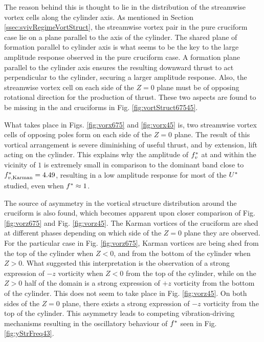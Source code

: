 \documentclass[oneside]{utmthesis}
\begin{document}
The reason behind this is thought to lie in the distribution of the streamwise vortex cells along the cylinder axis. As mentioned in Section \ref{ssec:svivRegimeVortStruct}, the streamwise vortex pair in the pure cruciform case lie on a plane parallel to the axis of the cylinder. The shared plane of formation parallel to cylinder axis is what seems to be the key to the large amplitude response observed in the pure cruciform case. A formation plane parallel to the cylinder axis ensures the resulting downward thrust to act perpendicular to the cylinder, securing a larger amplitude response. Also, the streamwise vortex cell on each side of the $Z = 0$ plane must be of opposing rotational direction for the production of thrust. These two aspects are found to be missing in the \angfo{} and \angth{} cruciforms in Fig. \ref{fig:vortStruct67545}.

What takes place in Figs. \ref{fig:vorx675} and \ref{fig:vorx45} is, two streamwise vortex cells of opposing poles form on each side of the $Z = 0$ plane. The result of this vortical arrangement is severe diminishing of useful thrust, and by extension, lift acting on the cylinder. This explains why the amplitude of $f^{*}_{v}$ at and within the vicinity of $1$ is extremely small in comparison to the dominant band close to $f^{*}_{v,\text{Karman}} = 4.49$, resulting in a low amplitude response for most of the $U^{*}$ studied, even when $f^{*} \approx 1$.

The source of asymmetry in the vortical structure distribution around the cruciform is also found, which becomes apparent upon closer comparison of Fig. \ref{fig:vorz675} and Fig. \ref{fig:vorz45}. The Karman vortices of the \angfo{} cruciform are shed at different phases depending on which side of the $Z = 0$ plane they are observed. For the particular case in Fig. \ref{fig:vorz675}, Karman vortices are being shed from the top of the cylinder when $Z < 0$, and from the bottom of the cylinder when $Z > 0$. What suggested this interpretation is the observation of a strong expression of $-z$ vorticity when $Z < 0$ from the top of the cylinder, while on the $Z > 0$ half of the domain is a strong expression of $+z$ vorticity from the bottom of the cylinder. This does not seem to take place in Fig. \ref{fig:vorz45}. On both sides of the $Z = 0$ plane, there exists a strong expression of $-z$ vorticity from the top of the cylinder. This asymmetry leads to competing vibration-driving mechanisms resulting in the oscillatory behaviour of $f^{*}$ seen in Fig. \ref{fig:yStrFreq43}.
\end{document}
